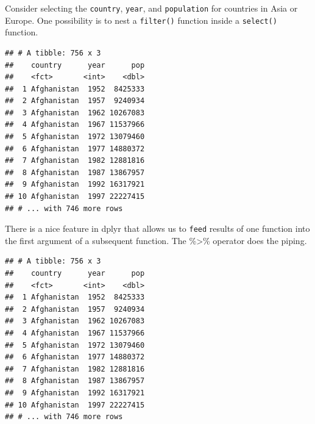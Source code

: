 \documentclass[]{article}
\newenvironment{Shaded}{\begin{snugshade}}{\end{snugshade}}
\newcommand{\KeywordTok}[1]{\textcolor[rgb]{0.13,0.29,0.53}{\textbf{#1}}}
\newcommand{\StringTok}[1]{\textcolor[rgb]{0.31,0.60,0.02}{#1}}
\newcommand{\OperatorTok}[1]{\textcolor[rgb]{0.81,0.36,0.00}{\textbf{#1}}}
\newcommand{\NormalTok}[1]{#1}
\begin{document}
Consider selecting the \texttt{country}, \texttt{year}, and
\texttt{population} for countries in Asia or Europe. One possibility is
to nest a \texttt{filter()} function inside a \texttt{select()}
function.

\begin{Shaded}
\end{Shaded}

\begin{verbatim}
## # A tibble: 756 x 3
##    country      year      pop
##    <fct>       <int>    <dbl>
##  1 Afghanistan  1952  8425333
##  2 Afghanistan  1957  9240934
##  3 Afghanistan  1962 10267083
##  4 Afghanistan  1967 11537966
##  5 Afghanistan  1972 13079460
##  6 Afghanistan  1977 14880372
##  7 Afghanistan  1982 12881816
##  8 Afghanistan  1987 13867957
##  9 Afghanistan  1992 16317921
## 10 Afghanistan  1997 22227415
## # ... with 746 more rows
\end{verbatim}

There is a nice feature in dplyr that allows us to \texttt{feed} results
of one function into the first argument of a subsequent function. The
\%\textgreater{}\% operator does the piping.

\begin{Shaded}
\end{Shaded}

\begin{verbatim}
## # A tibble: 756 x 3
##    country      year      pop
##    <fct>       <int>    <dbl>
##  1 Afghanistan  1952  8425333
##  2 Afghanistan  1957  9240934
##  3 Afghanistan  1962 10267083
##  4 Afghanistan  1967 11537966
##  5 Afghanistan  1972 13079460
##  6 Afghanistan  1977 14880372
##  7 Afghanistan  1982 12881816
##  8 Afghanistan  1987 13867957
##  9 Afghanistan  1992 16317921
## 10 Afghanistan  1997 22227415
## # ... with 746 more rows
\end{verbatim}
\end{document}
